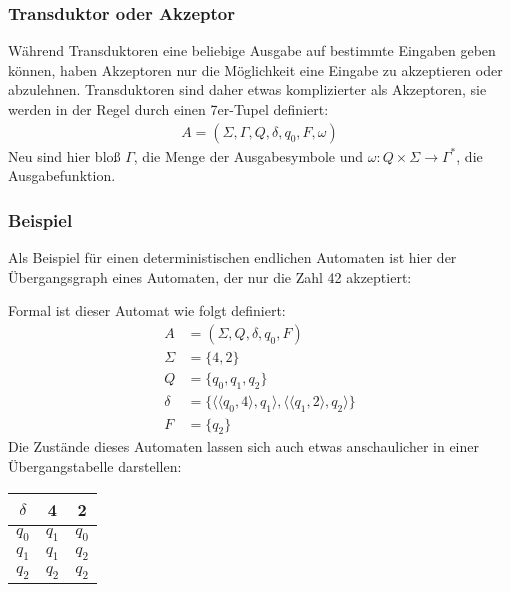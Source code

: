 \subsubsection{Transduktor oder Akzeptor}
\begin{flushleft}
    Während Transduktoren eine beliebige Ausgabe auf bestimmte Eingaben geben können, haben 
    Akzeptoren nur die Möglichkeit eine Eingabe zu akzeptieren oder abzulehnen.
    Transduktoren sind daher etwas komplizierter als Akzeptoren, sie werden in der Regel durch einen 7er-Tupel definiert:
    \begin{align}
        A=(\Sigma,\Gamma,Q,\delta,q_0,F,\omega)
    \end{align}
    Neu sind hier bloß $\Gamma$, die Menge der Ausgabesymbole und $\omega: Q \times \Sigma \rightarrow \Gamma^*$, die Ausgabefunktion.
\end{flushleft}

\subsubsection{Beispiel}
\begin{flushleft}
    Als Beispiel für einen deterministischen endlichen Automaten ist hier der Übergangsgraph eines
    Automaten, der nur die Zahl 42 akzeptiert:
    \begin{center}
    \end{center}
    Formal ist dieser Automat wie folgt definiert:
    \begin{align}
        A &= (\Sigma,Q,\delta,q_0,F) \\
        \Sigma &= \{4,2\} \\
        Q &= \{q_0,q_1,q_2\} \\
        \delta &= \{\langle \langle q_0, 4 \rangle, q_1 \rangle, \langle \langle q_1, 2 \rangle, q_2 \rangle \} \\
        F &= \{q_2\}
    \end{align}
    Die Zustände dieses Automaten lassen sich auch etwas anschaulicher in einer Übergangstabelle darstellen:
    \begin{center}
        \begin{tabular}{|c|c|c|}
            \hline
            $\delta$ & 4 & 2 \\
            \hline
            $q_0$ & $q_1$ & $q_0$ \\
            \hline
            $q_1$ & $q_1$ & $q_2$ \\
            \hline
            $q_2$ & $q_2$ & $q_2$ \\
            \hline
        \end{tabular}
    \end{center}
\end{flushleft}
